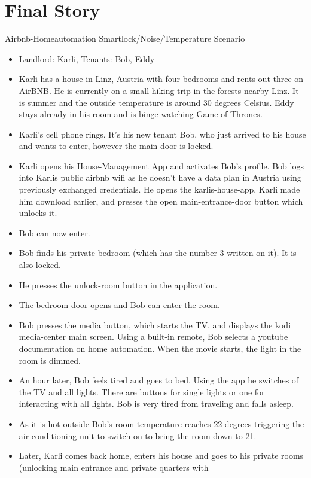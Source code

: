 ﻿\nosectionpage
\section{Final Story}
\withsectionpage

\begin{frame}{Airbnb-Homeautomation Smartlock/Noise/Temperature Scenario}
\begin{scriptsize}
\begin{itemize}
\item Landlord: Karli, Tenants: Bob, Eddy
\item Karli has a house in Linz, Austria with four bedrooms and rents out three on AirBNB. He is currently on a small hiking trip in the
forests nearby Linz. It is summer and the outside temperature is around 30 degrees Celsius. Eddy stays already in his room and is
binge-watching Game of Thrones.
\item Karli’s cell phone rings. It’s his new tenant Bob, who just arrived to his house and wants to enter, however the main door is locked.
\item Karli opens his House-Management App and activates Bob’s profile. Bob logs into Karlis public airbnb wifi as he doesn’t have a
data plan in Austria using previously exchanged credentials.
He opens the karlis-house-app, Karli made him download earlier, and presses the open main-entrance-door button which unlocks
it.
\item Bob can now enter.
\item Bob finds his private bedroom (which has the number 3 written on it). It is also locked.
\item He presses the unlock-room button in the application.
\item The bedroom door opens and Bob can enter the room.
\item Bob presses the media button, which starts the TV, and displays the kodi media-center main screen. Using a built-in remote, Bob
selects a youtube documentation on home automation. When the movie starts, the light in the room is dimmed.
\item An hour later, Bob feels tired and goes to bed. Using the app he switches of the TV and all lights. There are buttons for single lights
or one for interacting with all lights. Bob is very tired from traveling and falls asleep.
\item As it is hot outside Bob’s room temperature reaches 22 degrees triggering the air conditioning unit to switch on to bring the room
down to 21.
\item Later, Karli comes back home, enters his house and goes to his private rooms (unlocking main entrance and private quarters with

\end{itemize}
\end{scriptsize}
\end{frame}
